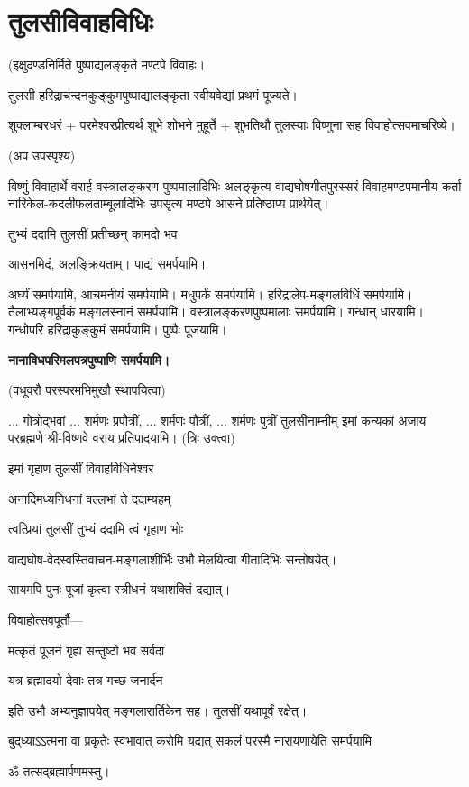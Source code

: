 \section{तुलसीविवाहविधिः}

(इक्षुदण्डनिर्मिते पुष्पाद्यलङ्कृते मण्टपे विवाहः।

तुलसी हरिद्राचन्दनकुङ्कुमपुष्पाद्यालङ्कृता स्वीयवेद्यां प्रथमं पूज्यते।

शुक्लाम्बरधरं + परमेश्वरप्रीत्यर्थं शुभे शोभने मुहूर्ते + शुभतिथौ तुलस्याः विष्णुना सह विवाहोत्सवमाचरिष्ये।

(अप उपस्पृश्य)

विष्णुं विवाहार्थे वरार्ह-वस्त्रालङ्करण-पुष्पमालादिभिः अलङ्कृत्य वाद्यघोषगीतपुरस्सरं विवाहमण्टपमानीय कर्ता नारिकेल-कदलीफलताम्बूलादिभिः उपसृत्य मण्टपे आसने प्रतिष्ठाप्य प्रार्थयेत्।

{तुभ्यं ददामि तुलसीं प्रतीच्छन् कामदो भव}


आसनमिदं, अलङ्क्रियताम्।
पाद्यं समर्पयामि।

अर्घ्यं समर्पयामि, आचमनीयं समर्पयामि।
मधुपर्कं समर्पयामि।
हरिद्रालेप-मङ्गलविधिं समर्पयामि।
तैलाभ्यङ्गपूर्वकं मङ्गलस्नानं समर्पयामि।
वस्त्रालङ्करणपुष्पमालाः समर्पयामि।
गन्धान् धारयामि। गन्धोपरि हरिद्राकुङ्कुमं समर्पयामि।
पुष्पैः पूजयामि।

\textbf{\devAya{} नानाविधपरिमलपत्रपुष्पाणि समर्पयामि।}

(वधूवरौ परस्परमभिमुखौ स्थापयित्वा)

... गोत्रोद्भवां ... शर्मणः प्रपौत्रीं, ... शर्मणः पौत्रीं, ... शर्मणः पुत्रीं 
तुलसीनाम्नीम् इमां कन्यकां अजाय 
परब्रह्मणे श्री-विष्णवे वराय प्रतिपादयामि। (त्रिः उक्त्वा) 

{इमां गृहाण तुलसीं विवाहविधिनेश्वर}

{अनादिमध्यनिधनां वल्लभां ते ददाम्यहम्}

{त्वत्प्रियां तुलसीं तुभ्यं ददामि त्वं गृहाण भोः}

वाद्यघोष-वेदस्वस्तिवाचन-मङ्गलाशीर्भिः उभौ मेलयित्वा गीतादिभिः सन्तोषयेत्।

सायमपि पुनः पूजां कृत्वा स्त्रीधनं यथाशक्तिं दद्यात्।

विवाहोत्सवपूर्तौ\textsf{---}\hfill\mbox{}

{मत्कृतं पूजनं गृह्य सन्तुष्टो भव सर्वदा}

{यत्र ब्रह्मादयो देवाः तत्र गच्छ जनार्दन}


इति उभौ अभ्यनुज्ञापयेत् मङ्गलारार्तिकेन सह। तुलसीं यथापूर्वं रक्षेत्।

{बुद्‌ध्याऽऽत्मना वा प्रकृतेः स्वभावात्}
{करोमि यद्यत् सकलं परस्मै}
{नारायणायेति समर्पयामि}

ॐ तत्सद्ब्रह्मार्पणमस्तु।

\closesection